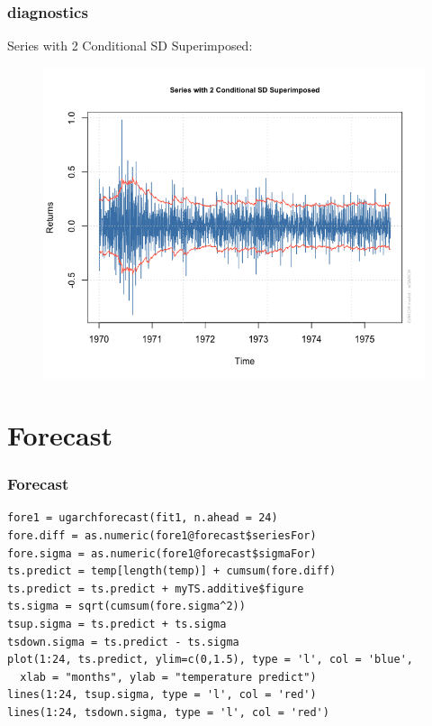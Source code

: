 \documentclass[9pt]{beamer}
\begin{document}
\begin{frame}[fragile]
\frametitle{diagnostics}
Series with 2 Conditional SD Superimposed:
\begin{figure}[H]
\centering
\includegraphics[scale=.40]{series_sd.png}
\end{figure}
\end{frame}

\section{Forecast}

\begin{frame}[fragile]
\frametitle{Forecast}
\begin{verbatim}
fore1 = ugarchforecast(fit1, n.ahead = 24)
fore.diff = as.numeric(fore1@forecast$seriesFor)
fore.sigma = as.numeric(fore1@forecast$sigmaFor)
ts.predict = temp[length(temp)] + cumsum(fore.diff)
ts.predict = ts.predict + myTS.additive$figure
ts.sigma = sqrt(cumsum(fore.sigma^2))
tsup.sigma = ts.predict + ts.sigma
tsdown.sigma = ts.predict - ts.sigma
plot(1:24, ts.predict, ylim=c(0,1.5), type = 'l', col = 'blue',
  xlab = "months", ylab = "temperature predict")
lines(1:24, tsup.sigma, type = 'l', col = 'red')
lines(1:24, tsdown.sigma, type = 'l', col = 'red')
\end{verbatim}
\end{frame}
\end{document}
